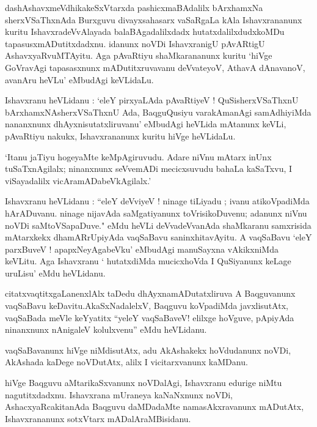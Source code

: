 \documentclass{article}
\begin{document}
\begin{mn}
dashAshavxmeVdhikakeSxVtarxda pashicxmaBAdalilx bArxhamxNa sherxVSaThxnAda Burxguvu divayxsahasarx
vaSaRgaLa kAla Ishavxrananunx kuritu IshavxradeVvAlayada balaBAgadalilxdadx hutatxdalilxdudxkoMDu 
tapasusxmADutitxdadxnu. idanunx noVDi IshavxranigU pAvARtigU AshavxyaRvuMTAyitu. Aga pAvaRtiyu 
shaMkarananunx kuritu `hiVge GoVravAgi tapasasxnunx mADutitxruvavanu deVvateyoV, AthavA dAnavanoV,
avanAru heVLu' eMbudAgi keVLidaLu.
\end{mn}

\begin{mn}
Ishavxranu heVLidanu : `eleY pirxyaLAda pAvaRtiyeV ! QuSisherxVSaThxnU bArxhamxNAsherxVSaThxnU Ada,
BaqguQusiyu varakAmanAgi samAdhiyiMda nananxnunx dhAyxnisutatxliruvanu' eMbudAgi heVLida mAtanunx 
keVLi, pAvaRtiyu nakukx, Ishavxrananunx kuritu hiVge heVLidaLu.
\end{mn}

\begin{mn}
`Itanu jaTiyu hogeyaMte keMpAgiruvudu. Adare niVnu mAtarx inUnx tuSaTxnAgilalx; ninanxnunx 
seVvemADi mecicxsuvudu bahaLa kaSaTxvu, I viSayadalilx vicAramADabeVkAgilalx.'
\end{mn}

\begin{mn}
Ishavxranu heVLidanu : ``eleY deVviyeV ! ninage tiLiyadu ;  ivanu atikoVpadiMda hArADuvanu. 
ninage nijavAda saMgatiyanunx toVrisikoDuvenu; adanunx niVnu noVDi saMtoVSapaDuve." eMdu heVLi
deVvadeVvanAda shaMkaranu samxrisida mAtarxkekx dhamARrUpiyAda vaqSaBavu saninxhitavAyitu. A 
vaqSaBavu `eleY parxBuveV ! apapxNeyAgabeVku' eMbudAgi manuSayxna vAkikxniMda keVLitu. Aga 
Ishavxranu ` hutatxdiMda mucicxhoVda I QuSiyanunx keLage uruLisu' eMdu heVLidanu.
\end{mn}


\begin{mn}
citatxvaqtitxgaLanenxlAlx taDedu dhAyxnamADutatxliruva A Baqguvanunx vaqSaBavu 
keDavitu.AkaSxNadalelxV, Baqguvu koVpadiMda javxlisutAtx, vaqSaBada meVle keYyatitx ``yeleY 
vaqSaBaveV! elilxge hoVguve, pApiyAda ninanxnunx nAnigaleV kolulxvenu'' eMdu heVLidanu.
\end{mn}

\begin{mn}
vaqSaBavanunx hiVge niMdisutAtx, adu AkAshakekx hoVdudanunx noVDi, AkAshada kaDege noVDutAtx, 
alilx I vicitarxvanunx kaMDanu.
\end{mn}

\begin{mn}
hiVge Baqguvu aMtarikaSxvanunx noVDalAgi, Ishavxranu edurige niMtu nagutitxdadxnu. Ishavxrana 
mUraneya kaNaNxnunx noVDi, AshacxyaRcakitanAda Baqguvu daMDadaMte namasAkxravanunx mADutAtx, 
Ishavxrananunx sotxVtarx mADalAraMBisidanu.
\end{mn}
\end{document}
